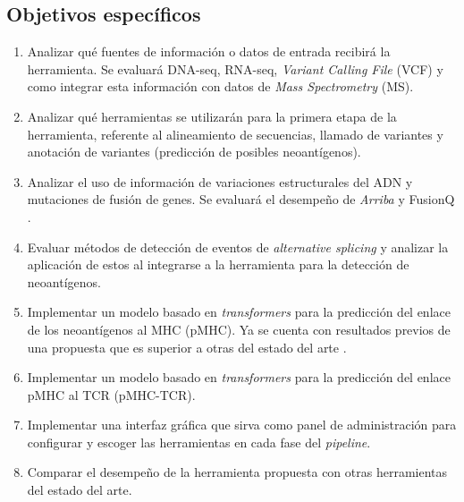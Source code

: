 \documentclass[a4paper,11pt]{article}
\begin{document}
	\subsection{Objetivos específicos}
	\begin{enumerate}
		\item Analizar qué fuentes de información o datos de entrada recibirá la herramienta. Se evaluará DNA-seq, RNA-seq, \textit{Variant Calling File} (VCF) y como integrar esta información con datos de \textit{Mass Spectrometry} (MS).
		
		\item Analizar qué herramientas se utilizarán para la primera etapa de la herramienta, referente al alineamiento de secuencias, llamado de variantes y  anotación de variantes (predicción de posibles neoantígenos). 
		
		\item Analizar el uso de información de variaciones estructurales del ADN y mutaciones de fusión de genes. Se evaluará el desempeño de \textit{Arriba} \cite{uhrig2021accurate} y FusionQ \cite{liu2013fusionq}.

        \item Evaluar métodos de detección de eventos de \textit{alternative splicing} y analizar la aplicación de estos al integrarse a la herramienta para la detección de neoantígenos.
		 
		\item Implementar un modelo basado en \textit{transformers} para la predicción del enlace de los neoantígenos al MHC (pMHC). Ya se cuenta con resultados previos de una propuesta que es superior a otras del estado del arte \cite{arceda2023neoantigen}.

        \item Implementar un modelo basado en \textit{transformers} para la predicción  del enlace pMHC al TCR (pMHC-TCR). 
        
        \item Implementar una interfaz gráfica que sirva como panel de administración para configurar y escoger las herramientas en cada fase del \textit{pipeline}.
		
        \item Comparar el desempeño de la herramienta propuesta con otras herramientas del estado del arte.

		
	\end{enumerate}
\end{document}
